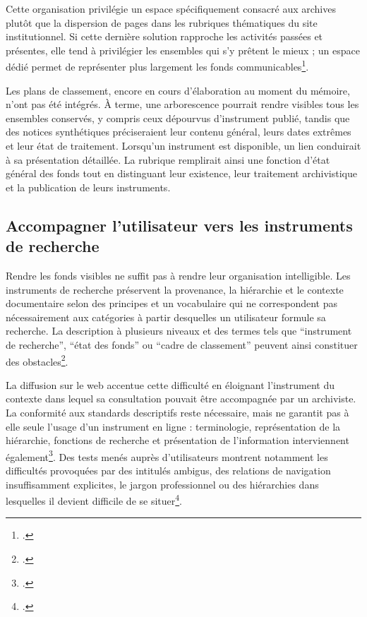 Cette organisation privilégie un espace spécifiquement consacré aux archives plutôt que la dispersion de pages dans les rubriques thématiques du site institutionnel. Si cette dernière solution rapproche les activités passées et présentes, elle tend à privilégier les ensembles qui s'y prêtent le mieux ; un espace dédié permet de représenter plus largement les fonds communicables\footcite[pp.~94--95]{FerradouFine2011}.

Les plans de classement, encore en cours d'élaboration au moment du mémoire, n'ont pas été intégrés. À terme, une arborescence pourrait rendre visibles tous les ensembles conservés, y compris ceux dépourvus d'instrument publié, tandis que des notices synthétiques préciseraient leur contenu général, leurs dates extrêmes et leur état de traitement. Lorsqu'un instrument est disponible, un lien conduirait à sa présentation détaillée. La rubrique remplirait ainsi une fonction d'état général des fonds tout en distinguant leur existence, leur traitement archivistique et la publication de leurs instruments.

\subsection{Accompagner l'utilisateur vers les instruments de recherche}

Rendre les fonds visibles ne suffit pas à rendre leur organisation intelligible. Les instruments de recherche préservent la provenance, la hiérarchie et le contexte documentaire selon des principes et un vocabulaire qui ne correspondent pas nécessairement aux catégories à partir desquelles un utilisateur formule sa recherche. La description à plusieurs niveaux et des termes tels que \enquote{instrument de recherche}, \enquote{état des fonds} ou \enquote{cadre de classement} peuvent ainsi constituer des obstacles\footcite[pp.~25--26]{Homer2021}.

La diffusion sur le web accentue cette difficulté en éloignant l'instrument du contexte dans lequel sa consultation pouvait être accompagnée par un archiviste. La conformité aux standards descriptifs reste nécessaire, mais ne garantit pas à elle seule l'usage d'un instrument en ligne : terminologie, représentation de la hiérarchie, fonctions de recherche et présentation de l'information interviennent également\footcite[pp.~24--27]{AlfierFeliciati2017}. Des tests menés auprès d'utilisateurs montrent notamment les difficultés provoquées par des intitulés ambigus, des relations de navigation insuffisamment explicites, le jargon professionnel ou des hiérarchies dans lesquelles il devient difficile de se situer\footcite[pp.~30--35]{Walton2017FindingAids}.

